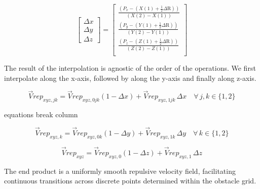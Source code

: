 \documentclass[letterpaper, 10 pt, conference]{ieeeconf}  %
\begin{document}
\begin{equation}
	\label{eq: deltas interp}
	\begin{bmatrix}
		\Delta x \\
		\Delta y \\
		\Delta z		
	\end{bmatrix}
	=
	\begin{bmatrix}
		\frac{\left( P_x - \left( X(1) + \frac{1}{2} \Delta \mathrm{R} \right)  \right)}{\left( X(2) - X(1) \right)} \\
		\frac{\left( P_y - \left( Y(1) + \frac{1}{2} \Delta \mathrm{R} \right)  \right)}{\left( Y(2) - Y(1) \right)} \\
		\frac{\left( P_z - \left( Z(1) + \frac{1}{2} \Delta \mathrm{R} \right)  \right)}{\left( Z(2) - Z(1) \right)} \\
	\end{bmatrix}
\end{equation}

The result of the interpolation is agnostic of the order of the operations. We first interpolate along the x-axis, followed by along the y-axis and finally along z-axis.
	
\begin{equation}
	\label{eq: interp x}
	\vec{V}rep_{xyz,jk} = \vec{V}rep_{xyz,0jk}(1 - \Delta x) + \vec{V}rep_{xyz,1jk} \, \Delta x \quad \forall \, j, k \in \{1, 2\}
\end{equation}

\alert{equations break column}

\begin{equation}
	\label{eq: interp y}
	\vec{V}rep_{xyz,k} = \vec{V}rep_{xyz,0k}(1 - \Delta y) + \vec{V}rep_{xyz,1k} \, \Delta y \quad \forall \, k \in \{1, 2\}
\end{equation}

\begin{equation}
	\label{eq: interp z}
	\vec{V}rep_{xyz} = \vec{V}rep_{xyz,0}(1 - \Delta z) + \vec{V}rep_{xyz,1} \, \Delta z 
\end{equation}

The end product is a uniformly smooth repulsive velocity field, facilitating continuous transitions across discrete points determined within the obstacle grid.
\end{document}
